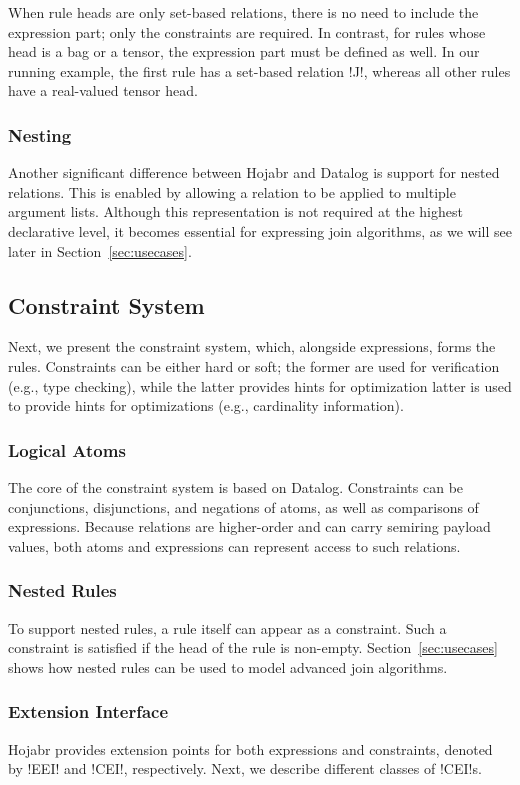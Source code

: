 \documentclass[sigconf,nonacm]{acmart}
\begin{document}
 When rule heads are only set-based relations, there is no need to include the expression part; only the constraints are required. In contrast, for rules whose head is a bag or a tensor, the expression part must be defined as well. In our running example, the first rule has a set-based relation !J!, whereas all other rules have a real-valued tensor head.

\subsubsection{Nesting} Another significant difference between Hojabr and Datalog is support for nested relations. This is enabled by allowing a relation to be applied to multiple argument lists. Although this representation is not required at the highest declarative level, it becomes essential for expressing join algorithms, as we will see later in Section~\ref{sec:usecases}.

\subsection{Constraint System}
Next, we present the constraint system, which, alongside expressions, forms the rules. Constraints can be either hard or soft; the former are used for verification (e.g., type checking), while the latter provides hints for optimization latter is used to provide hints for optimizations (e.g., cardinality information).
\subsubsection{Logical Atoms} 
The core of the constraint system is based on Datalog. Constraints can be conjunctions, disjunctions, and negations of atoms, as well as comparisons of expressions. Because relations are higher-order and can carry semiring payload values, both atoms and expressions can represent access to such relations.

\subsubsection{Nested Rules} To support nested rules, a rule itself can appear as a constraint. Such a constraint is satisfied if the head of the rule is non-empty. Section~\ref{sec:usecases} shows how nested rules can be used to model advanced join algorithms.

\subsubsection{Extension Interface}
Hojabr provides extension points for both expressions and constraints, denoted by !EEI! and !CEI!, respectively. Next, we describe different classes of !CEI!s.
\end{document}

